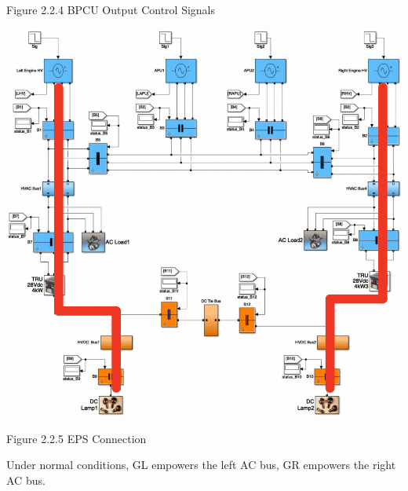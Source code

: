 \documentclass{mcmthesis}
\begin{document}
\begin{center}
\small{Figure 2.2.4 BPCU Output Control Signals}
\end{center}
\begin{center}
\includegraphics[width=13.5cm]{all_powered.png}
\end{center}
\begin{center}
\small{Figure 2.2.5 EPS Connection}
\end{center}
Under normal conditions, GL empowers the left AC bus, GR empowers the right AC bus. 
\pagebreak
\end{document}
